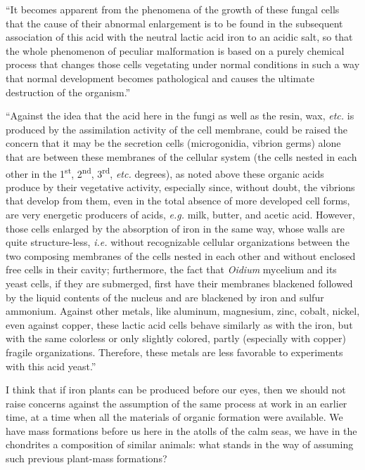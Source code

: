 \documentclass[a4paper, 12pt, oneside]{article}
\begin{document}
``It becomes apparent from the phenomena of the growth of these fungal cells that the cause of their abnormal enlargement is to be found in the subsequent association of this acid with the neutral lactic acid iron to an acidic salt, so that the whole phenomenon of peculiar malformation is based on a purely chemical process that changes those cells vegetating under normal conditions in such a way that normal development becomes pathological and causes the ultimate destruction of the organism.''

``Against the idea that the acid here in the fungi as well as the resin, wax, \emph{etc.} is produced by the assimilation activity of the cell membrane, could be raised the concern that it may be the secretion cells (microgonidia, vibrion germs) alone that are between these membranes of the cellular system (the cells nested in each other in the 1\textsuperscript{st}, 2\textsuperscript{nd}, 3\textsuperscript{rd}, \emph{etc.} degrees), as noted above these organic acids produce by their vegetative activity, especially since, without doubt, the vibrions that develop from them, even in the total absence of more developed cell forms, are very energetic producers of acids, \emph{e.g.} milk, butter, and acetic acid. However, those cells enlarged by the absorption of iron in the same way, whose walls are quite structure-less, \emph{i.e.} without recognizable cellular organizations between the two composing membranes of the cells nested in each other and without enclosed free cells in their cavity; furthermore, the fact that \emph{Oidium} mycelium and its yeast cells, if they are submerged, first have their membranes blackened followed by the liquid contents of the nucleus and are blackened by iron and sulfur ammonium. Against other metals, like aluminum, magnesium, zinc, cobalt, nickel, even against copper, these lactic acid cells behave similarly as with the iron, but with the same colorless or only slightly colored, partly (especially with copper) fragile organizations. Therefore, these metals are less favorable to experiments with this acid yeast.''

I think that if iron plants can be produced before our eyes, then we should not raise concerns against the assumption of the same process at work in an earlier time, at a time when all the materials of organic formation were available. We have mass formations before us here in the atolls of the calm seas, we have in the chondrites a composition of similar animals: what stands in the way of assuming such previous plant-mass formations?
\end{document}
